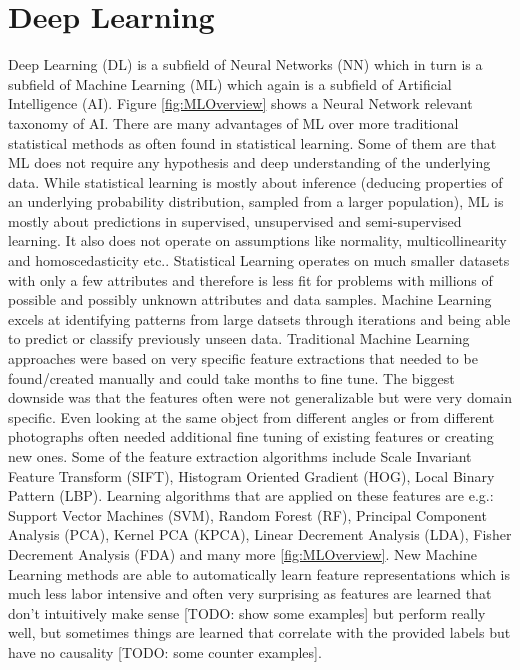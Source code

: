 \chapter{Deep Learning}

Deep Learning (DL) is a subfield of Neural Networks (NN) which in turn is a subfield of Machine Learning (ML) which again is a subfield of Artificial Intelligence (AI). Figure \ref{fig:MLOverview} shows a Neural Network relevant taxonomy of AI. There are many advantages of ML over more traditional statistical methods as often found in statistical learning. Some of them are that ML does not require any hypothesis and deep understanding of the underlying data. While statistical learning is mostly about inference (deducing properties of an underlying probability distribution, sampled from a larger population), ML is mostly about predictions in supervised, unsupervised and semi-supervised learning. It also does not operate on assumptions like normality, multicollinearity and homoscedasticity etc.. Statistical Learning operates on much smaller datasets with only a few attributes and therefore is less fit for problems with millions of possible and possibly unknown attributes and data samples. Machine Learning excels at identifying patterns from large datsets through iterations and being able to predict or classify previously unseen data.
Traditional Machine Learning approaches were based on very specific feature extractions that needed to be found/created manually and could take months to fine tune. The biggest downside was that the features often were not generalizable but were very domain specific. Even looking at the same object from different angles or from different photographs often needed additional fine tuning of existing features or creating new ones. Some of the feature extraction algorithms include Scale Invariant Feature Transform (SIFT), Histogram Oriented Gradient (HOG), Local Binary Pattern (LBP). Learning algorithms that are applied on these features are e.g.: Support Vector Machines (SVM), Random Forest (RF), Principal Component Analysis (PCA), Kernel PCA (KPCA), Linear Decrement Analysis (LDA), Fisher Decrement Analysis (FDA) and many more \ref{fig:MLOverview}. New Machine Learning methods are able to automatically learn feature representations which is much less labor intensive and often very surprising as features are learned that don't intuitively make sense [TODO: show some examples] but perform really well, but sometimes things are learned that correlate with the provided labels but have no causality [TODO: some counter examples].

